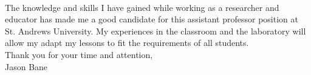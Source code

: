 \documentclass[12pt,letterpaper]{article}
\begin{document}
\paragraph{}The knowledge and skills I have gained while working as a researcher and educator has made me a good candidate for this assistant professor position at St. Andrews University. My experiences in the classroom and the laboratory will allow my adapt my lessons to fit the requirements of all students. 
\\

\noindent Thank you for your time and attention,\\
\noindent Jason Bane
\end{document}
